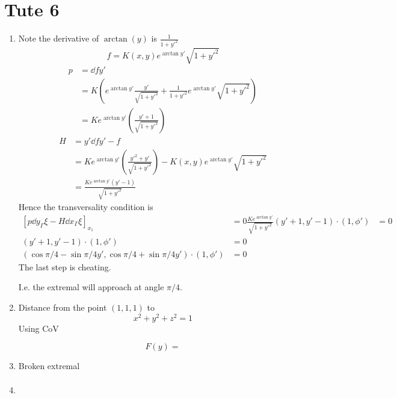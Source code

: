 \documentclass{E:/Documents/Latex/myassignment}
\begin{document}
\section{Tute 6}
\begin{enumerate}
	\item Note the derivative of $\arctan(y)$ is $\frac{1}{1 + y'^2 }$
	\[f = K(x,y) e^{\arctan y'} \sqrt{1+y'^2}\]
	\begin{align*}
		p &= \dd f{y'}\\
		&= K\left(e^{\arctan y'} \frac{y'}{\sqrt{1 + y'^2}} + \frac{1}{1 + y'^2} e^{\arctan y'} \sqrt{1+ y'^2}\right)\\
		&= K e^{\arctan y'} \left(\frac{y' + 1}{\sqrt{1 + y'^2}}\right)
	\end{align*}
	\begin{align*}
		H &= y' \dd f{y'} - f\\
		&=K e^{\arctan y'} \left(\frac{y'^2 + y'}{\sqrt{1 + y'^2}}\right) - K(x,y) e^{\arctan y'} \sqrt{1+y'^2}\\
		&= \frac{Ke^{\arctan y'} (y' - 1)}{\sqrt{1+y'^2}}
	\end{align*}
	Hence the transversality condition is
	\begin{align*}
		\left[p \dd{y_{\Gamma}}{\xi} - H \dd{x_\Gamma}{\xi}\right]_{x_1} &= 0
		\frac{Ke^{\arctan y'}}{\sqrt{1+y'^2}}\left(y ' +1,y' -1\right) \cdot \left(1, \phi'\right) &=0\\
		\left(y ' +1,y' -1\right) \cdot \left(1, \phi'\right) &=0\\
		\left(\cos\pi/4 - \sin\pi/4 y', \cos \pi/4 + \sin \pi/4 y'\right) \cdot (1,\phi') &= 0 
	\end{align*}
	The last step is cheating.

	I.e. the extremal will approach at angle $\pi/4$.

	\item Distance from the point $(1,1,1)$ to
	\[x^2 + y^2 + z^2 = 1\]
	Using CoV

	\[F(y) =  \]


	\item Broken extremal
	\begin{align*}
		 	
	\end{align*} 
	\item 
\end{enumerate}
\end{document}
